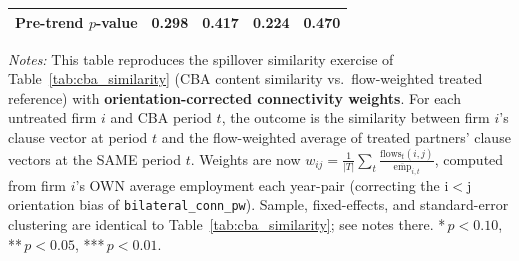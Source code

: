 \begin{table}[H]
\begin{tabular}{lcccc}
Pre-trend $p$-value & 0.298 & 0.417 & 0.224 & 0.470 \\
\hline\hline
\end{tabular}
\begin{minipage}{\linewidth}
\smallskip
\scriptsize\textit{Notes:} This table reproduces the spillover similarity exercise of Table~\ref{tab:cba_similarity} (CBA content similarity vs.\ flow-weighted treated reference) with \textbf{orientation-corrected connectivity weights}. For each untreated firm $i$ and CBA period $t$, the outcome is the similarity between firm $i$'s clause vector at period $t$ and the flow-weighted average of treated partners' clause vectors at the SAME period $t$. Weights are now $w_{ij} = \frac{1}{|T|} \sum_t \frac{\text{flows}_t(i,j)}{\overline{\text{emp}}_{i,t}}$, computed from firm $i$'s OWN average employment each year-pair (correcting the i$<$j orientation bias of \texttt{bilateral\_conn\_pw}). Sample, fixed-effects, and standard-error clustering are identical to Table~\ref{tab:cba_similarity}; see notes there. *\,$p<0.10$, **\,$p<0.05$, ***\,$p<0.01$.
\end{minipage}
\end{table}
